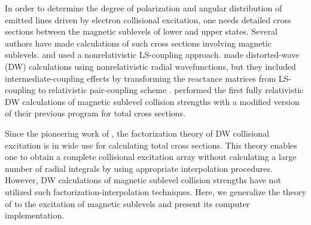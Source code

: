 In order to determine the degree of polarization and angular distribution of
emitted lines driven by electron collisional excitation, one needs detailed
cross sections between the magnetic sublevels of lower and upper states. Several
authors have made calculations of such cross sections involving magnetic
sublevels. \citet{mitroy:1988a} and \citet{mitroy:1988b} used a nonrelativistic
LS-coupling approach. \citet{inal87} made distorted-wave (DW) calculations using
nonrelativistic radial wavefunctions, but they included intermediate-coupling
effects by transforming the reactance matrices from LS-coupling to relativistic
pair-coupling scheme \citep{eissner72, saraph:1978a}. \citet{zhang90} performed
the first fully relativistic DW calculations of magnetic sublevel collision
strengths with a modified version of their previous program for total cross
sections.

Since the pioneering work of \citet{barshalom:1988a}, the factorization theory
of DW collisional excitation is in wide use for calculating total cross
sections. This theory enables one to obtain a complete collisional excitation
array without calculating a large number of radial integrals by using
appropriate interpolation procedures. However, DW calculations of magnetic
sublevel collision strengths have not utilized such factorization-interpolation
techniques. Here, we generalize the theory of \citet{barshalom:1988a}
to the excitation of magnetic sublevels and present its computer implementation.

